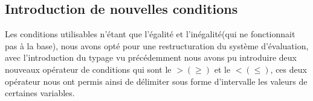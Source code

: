 \subsection{Introduction de nouvelles conditions}
Les conditions utilisables n'étant que l'égalité et l'inégalité(qui ne fonctionnait pas à la base), nous avons opté pour une restructuration du système d'évaluation, avec l'introduction du typage vu précédemment nous avons pu introduire deux nouveaux opérateur de conditions qui sont le $>(\geq) $ et le $<(\leq)$, ces deux opérateur nous ont permis ainsi de délimiter sous forme d'intervalle les valeurs de certaines variables. 